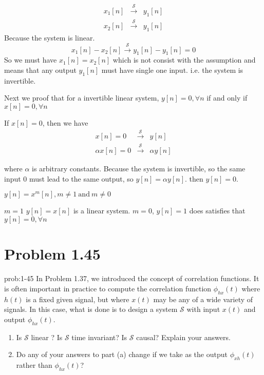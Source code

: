 \documentclass[koma,a4paper,utopia,12pt,listings-color,microtype,paralist,colorlinks,urlcolor=red]{org-article}
\begin{document}
\begin{eqnarray*}
x_{1}[n] &\xrightarrow{\mathcal{S}}& y_{1}[n] \\
x_{2}[n] &\xrightarrow{\mathcal{S}}& y_{1}[n]
\end{eqnarray*}
Because the system is linear.
\begin{equation*}
x_{1}[n] - x_{2}[n] \xrightarrow{\mathcal{S}} y_{1}[n]-y_{1}[n] = 0
\end{equation*}
So we must have \(x_{1}[n] = x_{2}[n]\) which is not consist with the
assumption and means that any output \(y_{1}[n]\) must have single one input.
i.e. the system is invertible.


Next we proof that for a invertible linear system, \(y[n] = 0, \forall n\) if
and only if \(x[n] = 0, \forall n\)

If \(x[n] = 0\), then we have
\begin{eqnarray*}
x[n] = 0 &\xrightarrow{\mathcal{S}} &y[n] \\
\alpha x[n] = 0 &\xrightarrow{\mathcal{S}}&  \alpha y[n]
\end{eqnarray*}

where \(\alpha\) is arbitrary constants. Because the system is invertible, so
the same input \(0\) must lead to the same output, so \(y[n]=\alpha y[n]\).
then \(y[n] = 0\).

\(y[n] = x^{m}[n] , m\neq 1 \ \mathrm{and}\ m\neq 0\)

\(m=1\) \(y[n] = x[n]\) is a linear system.
\(m=0\), \(y[n] = 1\) does satisfies that \(y[n]= 0, \forall n\)
\section{Problem 1.45}
\label{sec:orgb8bc776}


\begin{prob}[]{prob:1-45}
In Problem 1.37, we introduced the concept of correlation functions. It is
often important in practice to compute the correlation function
\(\phi_{hx}(t)\) where \(h(t)\) is a fixed given signal, but where \(x(t)\)
may be any of a wide variety of signals. In this case, what is done is to
design a system \(\mathcal{S}\) with input \(x(t)\) and output
\(\phi_{hx}(t)\).

\begin{enumerate}
\item Is \(\mathcal{S}\) linear ? Is \(\mathcal{S}\) time invariant? Is
\(\mathcal{S}\) causal? Explain your answers.
\item Do any of your answers to part (a) change if we take as the output
\(\phi_{xh}(t)\) rather than \(\phi_{hx}(t)\)?
\end{enumerate}
\label{prob:1-45}
\end{prob}
\end{document}
